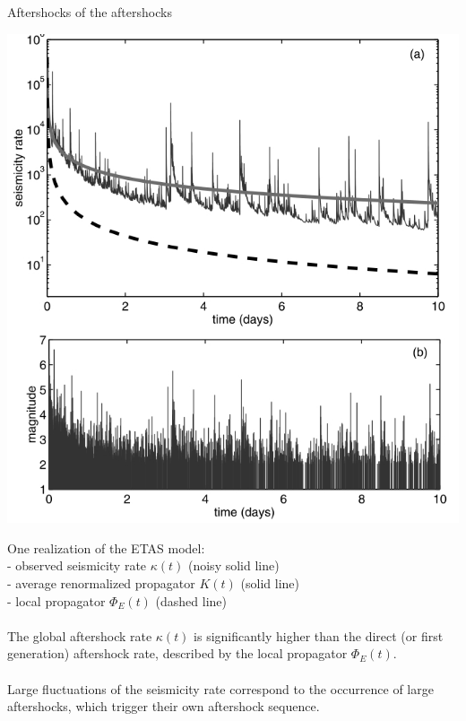 \documentclass[aspectratio=43,9pt]{beamer}
\begin{document}
\begin{frame}
 {Aftershocks of the aftershocks}
 
 \begin{minipage}{0.48\linewidth}
   \includegraphics[width=1\linewidth]{Figs/fig1}
 \end{minipage}
 \begin{minipage}{0.48\linewidth}
  One realization of the ETAS model: \\
  - observed seismicity rate $\kappa (t)$ (noisy solid line) \\ 
  - average renormalized propagator $K(t)$ (solid line) \\
  - local propagator $\Phi_E (t)$ (dashed line) \\ \\
  The global aftershock rate $\kappa (t)$ is significantly higher
than the direct (or first generation) aftershock rate,
described by the local propagator $\Phi_E (t)$. \\ \\
Large fluctuations of
the seismicity rate correspond to the occurrence of large
aftershocks, which trigger their own aftershock sequence.
 \end{minipage}

 
\end{frame}
\end{document}
